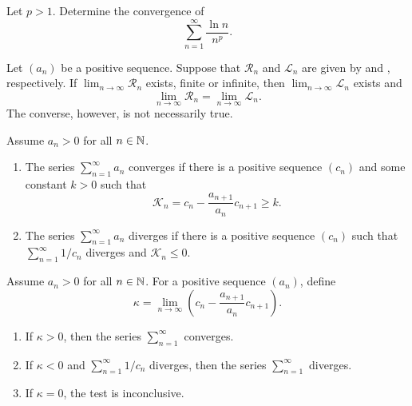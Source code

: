 \begin{example}
  Let $p > 1$. Determine the convergence of
  \[ \sum_{n = 1}^{\infty} \frac{\ln n}{n^p}. \]
\end{example}

\begin{proposition}
  Let $(a_n)$ be a positive sequence. Suppose that $\mathcal{R}_n$
  and $\mathcal{L}_n$ are given by  and
  , respectively. If $\lim_{n \to \infty}
  \mathcal{R}_n$ exists, finite or infinite, then $\lim_{n \to
  \infty} \mathcal{L}_n$ exists and
  \[ \lim_{n \to \infty} \mathcal{R}_n = \lim_{n \to \infty} \mathcal{L}_n. \]
  The converse, however, is not necessarily true.
\end{proposition}

\begin{proposition}
  Assume $a_n > 0$ for all $n \in \mathbb N$.
  \begin{enumerate}
    \item The series $\sum_{n = 1}^{\infty} a_n$ converges if there
      is a positive sequence $(c_n)$ and some constant $k > 0$ such that
      \[ \mathcal{K}_n = c_n - \frac{a_{n + 1}}{a_n} c_{n + 1} \geq k. \]
    \item The series $\sum_{n = 1}^{\infty} a_n$ diverges if there is
      a positive sequence $(c_n)$ such that $\sum_{n = 1}^{\infty} 1/c_n$
      diverges and $\mathcal{K}_n \leq 0$.
  \end{enumerate}
\end{proposition}

\begin{proposition}
  Assume $a_n > 0$ for all $n \in \mathbb N$. For a positive sequence $(a_n)$, define
  \[ \kappa = \lim_{n \to \infty} \left(c_n - \frac{a_{n + 1}}{a_n}
  c_{n + 1}\right). \]
  \begin{enumerate}
    \item If $\kappa > 0$, then the series $\sum_{n = 1}^{\infty}$ converges.
    \item If $\kappa < 0$ and $\sum_{n = 1}^{\infty} 1/c_n$ diverges,
      then the series $\sum_{n = 1}^{\infty}$ diverges.
    \item If $\kappa = 0$, the test is inconclusive.
  \end{enumerate}
\end{proposition}

